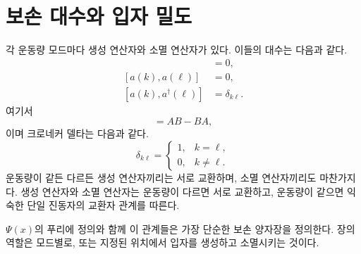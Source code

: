 \section{보손 대수와 입자 밀도}

각 운동량 모드마다 생성 연산자와 소멸 연산자가 있다. 이들의 대수는 다음과 같다.
\begin{align}
[a^\dagger(k),a^\dagger(\ell)]&=0,\\
[a(k),a(\ell)]&=0,\\
[a(k),a^\dagger(\ell)]&=\delta_{k\ell}.
\end{align}
여기서
\begin{equation}
[A,B]=AB-BA,
\end{equation}
이며 크로네커 델타는 다음과 같다.
\begin{equation}
\delta_{k\ell}=
\begin{cases}
1,&k=\ell,\\
0,&k\ne\ell.
\end{cases}
\end{equation}
운동량이 같든 다르든 생성 연산자끼리는 서로 교환하며, 소멸 연산자끼리도 마찬가지다. 생성 연산자와 소멸 연산자는 운동량이 다르면 서로 교환하고, 운동량이 같으면 익숙한 단일 진동자의 교환자 관계를 따른다.

\(\Psi(x)\)의 푸리에 정의와 함께 이 관계들은 가장 단순한 보손 양자장을 정의한다. 장의 역할은 모드별로, 또는 지정된 위치에서 입자를 생성하고 소멸시키는 것이다.

